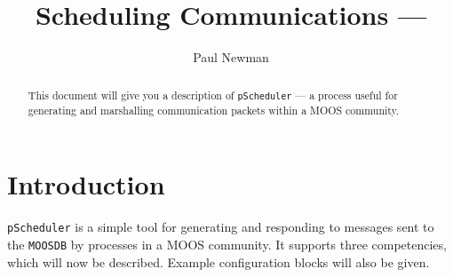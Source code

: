 \documentclass[a4paper,10pt]{article}
\title{Scheduling Communications --- \code{pScheduler}}
\author{Paul Newman}
\newcommand{\Code}[1]{\texttt{#1} }
\newcommand{\code}[1]{\Code{#1} }
\begin{document}
\maketitle

\begin{center}
\end{center}
\begin{abstract}
This document will give you a description of \code{pScheduler} ---  a process useful for generating and marshalling communication packets within a MOOS community.
\end{abstract}

\section{Introduction}\label{Sec:pScheduler}

\code{pScheduler} is a simple tool for generating and responding
to messages sent to the \code{MOOSDB} by processes in a MOOS
community. It supports three competencies, which will now be
described. Example configuration blocks will also be given.
\end{document}
